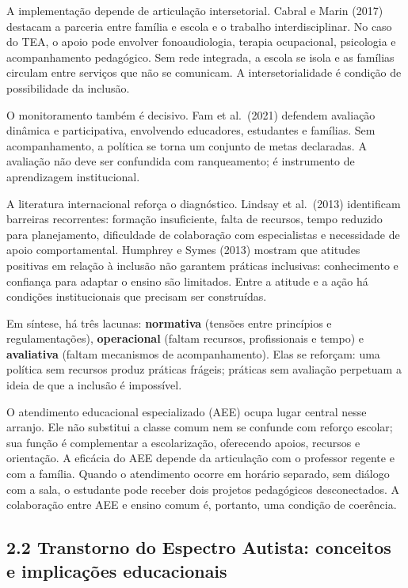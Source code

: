 A implementação depende de articulação intersetorial. Cabral e Marin
(2017) destacam a parceria entre família e escola e o trabalho
interdisciplinar. No caso do TEA, o apoio pode envolver fonoaudiologia,
terapia ocupacional, psicologia e acompanhamento pedagógico. Sem rede
integrada, a escola se isola e as famílias circulam entre serviços que
não se comunicam. A intersetorialidade é condição de possibilidade da
inclusão.

O monitoramento também é decisivo. Fam et al.~(2021) defendem avaliação
dinâmica e participativa, envolvendo educadores, estudantes e famílias.
Sem acompanhamento, a política se torna um conjunto de metas declaradas.
A avaliação não deve ser confundida com ranqueamento; é instrumento de
aprendizagem institucional.

A literatura internacional reforça o diagnóstico. Lindsay et al.~(2013)
identificam barreiras recorrentes: formação insuficiente, falta de
recursos, tempo reduzido para planejamento, dificuldade de colaboração
com especialistas e necessidade de apoio comportamental. Humphrey e
Symes (2013) mostram que atitudes positivas em relação à inclusão não
garantem práticas inclusivas: conhecimento e confiança para adaptar o
ensino são limitados. Entre a atitude e a ação há condições
institucionais que precisam ser construídas.

Em síntese, há três lacunas: \textbf{normativa} (tensões entre
princípios e regulamentações), \textbf{operacional} (faltam recursos,
profissionais e tempo) e \textbf{avaliativa} (faltam mecanismos de
acompanhamento). Elas se reforçam: uma política sem recursos produz
práticas frágeis; práticas sem avaliação perpetuam a ideia de que a
inclusão é impossível.

O atendimento educacional especializado (AEE) ocupa lugar central nesse
arranjo. Ele não substitui a classe comum nem se confunde com reforço
escolar; sua função é complementar a escolarização, oferecendo apoios,
recursos e orientação. A eficácia do AEE depende da articulação com o
professor regente e com a família. Quando o atendimento ocorre em
horário separado, sem diálogo com a sala, o estudante pode receber dois
projetos pedagógicos desconectados. A colaboração entre AEE e ensino
comum é, portanto, uma condição de coerência.

\subsection{2.2 Transtorno do Espectro Autista: conceitos e implicações
educacionais}\label{transtorno-do-espectro-autista-conceitos-e-implicauxe7uxf5es-educacionais}

